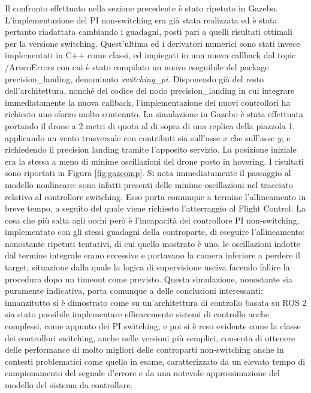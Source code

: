 \indent Il confronto effettuato nella sezione precedente è stato ripetuto in Gazebo. L'implementazione del PI non-switching era già stata realizzata ed è stata pertanto riadattata cambiando i guadagni, posti pari a quelli risultati ottimali per la versione switching. Quest'ultima ed i derivatori numerici sono stati invece implementati in C++ come classi, ed impiegati in una nuova callback dal topic /ArucoErrors con cui è stato compilato un nuovo eseguibile del package precision\_landing, denominato \emph{switching\_pi}. Disponendo già del resto dell'architettura, nonché del codice del nodo precision\_landing in cui integrare immediatamente la nuova callback, l'implementazione dei nuovi controllori ha richiesto uno sforzo molto contenuto. La simulazione in Gazebo è stata effettuata portando il drone a 2 metri di quota al di sopra di una replica della piazzola 1, applicando un vento trasversale con contributi sia sull'asse $x$ che sull'asse $y$, e richiedendo il precision landing tramite l'apposito servizio. La posizione iniziale era la stessa a meno di minime oscillazioni del drone posto in hovering. I risultati sono riportati in Figura \ref{fig:gazcomp}. Si nota immediatamente il passaggio al modello nonlineare: sono infatti presenti delle minime oscillazioni nel tracciato relativo al controllore switching. Esso porta comunque a termine l'allineamento in breve tempo, a seguito del quale viene richiesto l'atterraggio al Flight Control. La cosa che più salta agli occhi però è l'incapacità del controllore PI non-switching, implementato con gli stessi guadagni della controparte, di eseguire l'allineamento: nonostante ripetuti tentativi, di cui quello mostrato è uno, le oscillazioni indotte dal termine integrale erano eccessive e portavano la camera inferiore a perdere il target, situazione dalla quale la logica di supervisione usciva facendo fallire la procedura dopo un timeout come previsto. Questa simulazione, nonostante sia puramente indicativa, porta comunque a delle conclusioni interessanti: innanzitutto si è dimostrato come su un'architettura di controllo basata su ROS 2 sia stato possibile implementare efficacemente sistemi di controllo anche complessi, come appunto dei PI switching, e poi si è reso evidente come la classe dei controllori switching, anche nelle versioni più semplici, consenta di ottenere delle performance di molto migliori delle controparti non-switching anche in contesti problematici come quello in esame, caratterizzato da un elevato tempo di campionamento del segnale d'errore e da una notevole approssimazione del modello del sistema da controllare.

